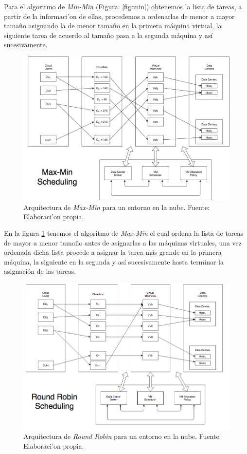 Para el algoritmo de \textit{Min-Min} (Figura: \ref{fig:min}) obtenemos la lista de tareas, a partir de la informaci'on de ellas, procedemos a ordenarlas de menor a mayor tamaño asignando la de menor tamaño en la primera máquina virtual, la siguiente tarea de acuerdo al tamaño pasa a la segunda máquina y así sucesivamente.

\newpage
\renewcommand\thefigure{\arabic{figure}}
\begin{figure}[h!]
	\centering
	\includegraphics[scale=0.4]{media/imagencuatro}
	\caption{Arquitectura de \textit{Max-Min} para un entorno en la nube. Fuente: Elaboraci'on propia.}
	\label{fig:max}
\end{figure}

En la figura \ref{fig:max} tenemos el algoritmo de \textit{Max-Min} el cual ordena la lista de tareas de mayor a menor tamaño antes de asignarlas a las máquinas virtuales, una vez ordenada dicha lista procede a asignar la tarea más grande en la primera máquina, la siguiente en la segunda y así sucesivamente hasta terminar la asignación de las tareas.

\newpage
\renewcommand\thefigure{\arabic{figure}}
\begin{figure}[h!]
	\centering
	\includegraphics[scale=0.4]{media/RRAlgorithm}
	\caption{Arquitectura de \textit{Round Robin} para un entorno en la nube. Fuente: Elaboraci'on propia.}
	\label{fig:RRAlgorithm}
\end{figure}

